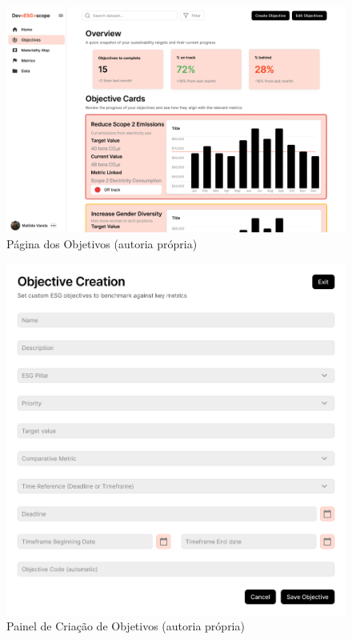 \begin{figure}[H]
    \centering
    \includegraphics[width=\linewidth]{frontmatter/assets/mockup/Objective Tracking + Comparision with current Metrics.png}
    \caption{Página dos Objetivos (autoria própria)}
    \label{fig:objectivePage}
\end{figure}

\begin{figure}[H]
    \centering
    \includegraphics[width=\linewidth]{frontmatter/assets/mockup/Objective Creation.png}
    \caption{Painel de Criação de Objetivos (autoria própria)}
    \label{fig:customObjectiveModal}
\end{figure}